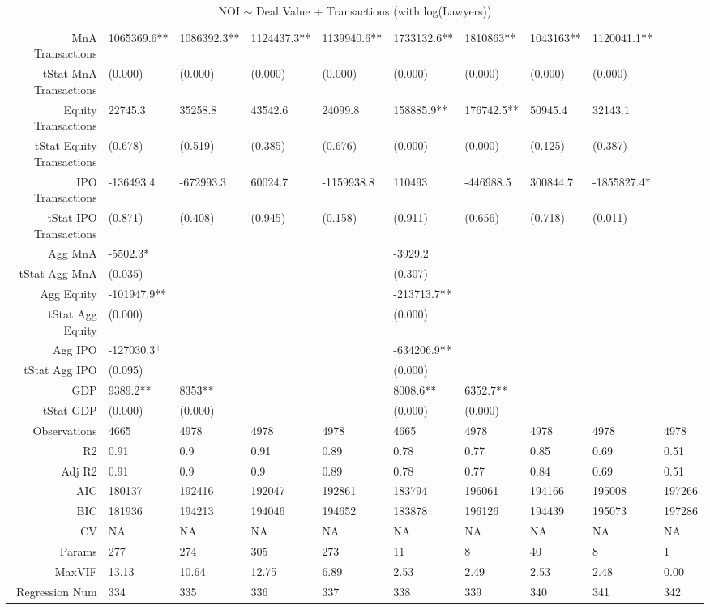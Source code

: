\begin{table}[ht]
\begin{tabular}{rlllllllll}
  MnA Transactions & 1065369.6** & 1086392.3** & 1124437.3** & 1139940.6** & 1733132.6** & 1810863** & 1043163** & 1120041.1** &  \\ 
  tStat MnA Transactions & (0.000) & (0.000) & (0.000) & (0.000) & (0.000) & (0.000) & (0.000) & (0.000) &  \\ 
  Equity Transactions & 22745.3 & 35258.8 & 43542.6 & 24099.8 & 158885.9** & 176742.5** & 50945.4 & 32143.1 &  \\ 
  tStat Equity Transactions & (0.678) & (0.519) & (0.385) & (0.676) & (0.000) & (0.000) & (0.125) & (0.387) &  \\ 
  IPO Transactions & -136493.4 & -672993.3 & 60024.7 & -1159938.8 & 110493 & -446988.5 & 300844.7 & -1855827.4* &  \\ 
  tStat IPO Transactions & (0.871) & (0.408) & (0.945) & (0.158) & (0.911) & (0.656) & (0.718) & (0.011) &  \\ 
  Agg MnA & -5502.3* &  &  &  & -3929.2 &  &  &  &  \\ 
  tStat Agg MnA & (0.035) &  &  &  & (0.307) &  &  &  &  \\ 
  Agg Equity & -101947.9** &  &  &  & -213713.7** &  &  &  &  \\ 
  tStat Agg Equity & (0.000) &  &  &  & (0.000) &  &  &  &  \\ 
  Agg IPO & -127030.3$^{+}$ &  &  &  & -634206.9** &  &  &  &  \\ 
  tStat Agg IPO & (0.095) &  &  &  & (0.000) &  &  &  &  \\ 
  GDP & 9389.2** & 8353** &  &  & 8008.6** & 6352.7** &  &  &  \\ 
  tStat GDP & (0.000) & (0.000) &  &  & (0.000) & (0.000) &  &  &  \\ 
  Observations & 4665 & 4978 & 4978 & 4978 & 4665 & 4978 & 4978 & 4978 & 4978 \\ 
  R2 & 0.91 & 0.9 & 0.91 & 0.89 & 0.78 & 0.77 & 0.85 & 0.69 & 0.51 \\ 
  Adj R2 & 0.91 & 0.9 & 0.9 & 0.89 & 0.78 & 0.77 & 0.84 & 0.69 & 0.51 \\ 
  AIC & 180137 & 192416 & 192047 & 192861 & 183794 & 196061 & 194166 & 195008 & 197266 \\ 
  BIC & 181936 & 194213 & 194046 & 194652 & 183878 & 196126 & 194439 & 195073 & 197286 \\ 
  CV & NA & NA & NA & NA & NA & NA & NA & NA & NA \\ 
  Params & 277 & 274 & 305 & 273 & 11 & 8 & 40 & 8 & 1 \\ 
  MaxVIF & 13.13 & 10.64 & 12.75 & 6.89 & 2.53 & 2.49 & 2.53 & 2.48 & 0.00 \\ 
  Regression Num & 334 & 335 & 336 & 337 & 338 & 339 & 340 & 341 & 342 \\ 
   \hline
\end{tabular}
\caption{NOI $\sim$ Deal Value + Transactions (with log(Lawyers))} 
\end{table}
